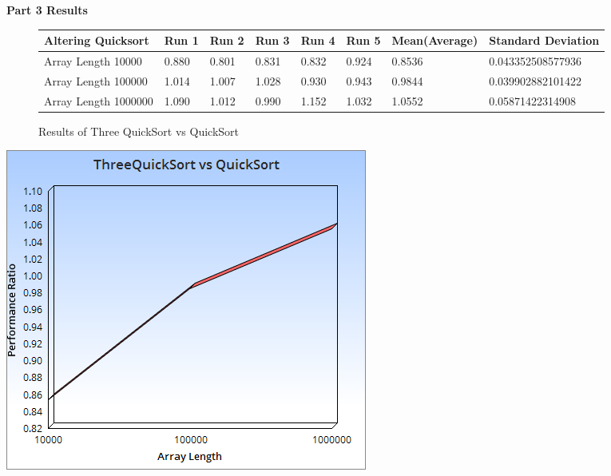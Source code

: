 \documentclass{article}
\begin{document}
\begin{center}
\textbf{Part 3 Results}
\end{center}
\begin{figure}[H]
\centering
\begin{adjustwidth}{-3.4cm}{}
\begin{tabular}{| l | l | l | l | l | l | l | l |}
\hline
Altering Quicksort & Run 1 & Run 2 & Run 3 & Run 4 & Run 5 & Mean(Average) & Standard Deviation\\ \hline
Array Length 10000 & 0.880 & 0.801 & 0.831 & 0.832 & 0.924 & 0.8536 & 0.043352508577936 \\ \hline
Array Length 100000  & 1.014 & 1.007 & 1.028 & 0.930 & 0.943 & 0.9844 & 0.039902882101422\\ \hline
Array Length 1000000  & 1.090 & 1.012 & 0.990 & 1.152 & 1.032 & 1.0552 & 0.05871422314908 \\ \hline
\end{tabular}
\caption{Results of Three QuickSort vs QuickSort}
\end{adjustwidth}
\end{figure}

\includegraphics[scale=0.75]{ThreeQuickSort.png}

\newpage
\end{document}
